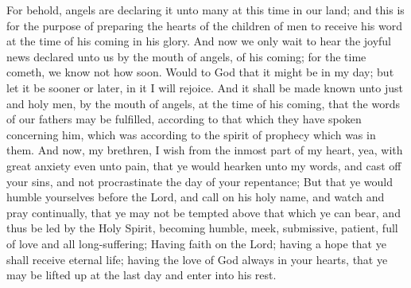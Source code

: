 For behold, angels are declaring it unto many at this time in our land; and this is for the purpose of preparing the hearts of the children of men to receive his word at the time of his coming in his glory.
\bverse \iffalse And now we only wait to hear the joyful news declared unto us by the mouth of angels, of his coming; for the time cometh, we know not how soon. Would to God that it might be in my day; but let it be sooner or later, in it I will rejoice. \fi
And now we only wait to hear the joyful news declared unto us by the mouth of angels, of his coming; for the time cometh, we know not how soon. Would to God that it might be in my day; but let it be sooner or later, in it I will rejoice.
\bverse \iffalse And it shall be made known unto just and holy men, by the mouth of angels, at the time of his coming, that the words of our fathers may be fulfilled, according to that which they have spoken concerning him, which was according to the spirit of prophecy which was in them. \fi
And it shall be made known unto just and holy men, by the mouth of angels, at the time of his coming, that the words of our fathers may be fulfilled, according to that which they have spoken concerning him, which was according to the spirit of prophecy which was in them.
\bverse \iffalse And now, my brethren, I wish from the inmost part of my heart, yea, with great anxiety even unto pain, that ye would hearken unto my words, and cast off your sins, and not procrastinate the day of your repentance; \fi
And now, my brethren, I wish from the inmost part of my heart, yea, with great anxiety even unto pain, that ye would hearken unto my words, and cast off your sins, and not procrastinate the day of your repentance;
\bverse \iffalse But that ye would humble yourselves before the Lord, and call on his holy name, and watch and pray continually, that ye may not be tempted above that which ye can bear, and thus be led by the Holy Spirit, becoming humble, meek, submissive, patient, full of love and all long-suffering; \fi
But that ye would humble yourselves before the Lord, and call on his holy name, and watch and pray continually, that ye may not be tempted above that which ye can bear, and thus be led by the Holy Spirit, becoming humble, meek, submissive, patient, full of love and all long-suffering;
\bverse \iffalse Having faith on the Lord; having a hope that ye shall receive eternal life; having the love of God always in your hearts, that ye may be lifted up at the last day and enter into his rest. \fi
Having faith on the Lord; having a hope that ye shall receive eternal life; having the love of God always in your hearts, that ye may be lifted up at the last day and enter into his rest.
